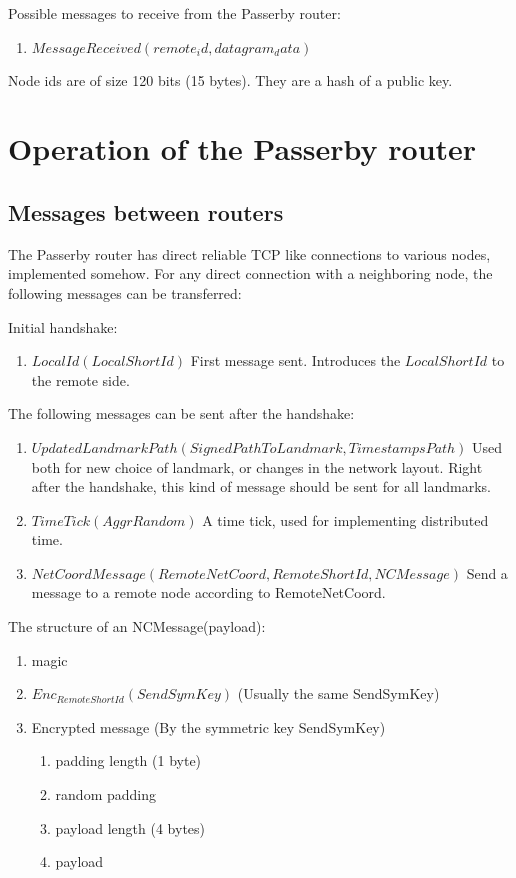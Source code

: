 \documentclass{amsart}
\theoremstyle{definition}
\theoremstyle{remark}
\numberwithin{equation}{section}
\begin{document}
Possible messages to receive from the Passerby router:
\begin{enumerate}
  \item $MessageReceived (remote_id, datagram_data)$
\end{enumerate}

Node ids are of size 120 bits (15 bytes). They are a hash of a public key.

\section{Operation of the Passerby router}

\subsection{Messages between routers}

The Passerby router has direct reliable TCP like connections to various nodes,
implemented somehow. For any direct connection with a neighboring node, the
following messages can be transferred:

Initial handshake:
\begin{enumerate}
  \item $LocalId(LocalShortId)$
      First message sent. Introduces the $LocalShortId$ to the remote side.
\end{enumerate}

The following messages can be sent after the handshake:

\begin{enumerate}
  \item $UpdatedLandmarkPath(SignedPathToLandmark, TimestampsPath)$
      Used both for new choice of landmark, or changes in the network layout.
      Right after the handshake, this kind of message should be sent for all
      landmarks.
  \item $TimeTick(AggrRandom)$
      A time tick, used for implementing distributed time.
  \item $NetCoordMessage(RemoteNetCoord, RemoteShortId, NCMessage)$
    Send a message to a remote node according to RemoteNetCoord.
\end{enumerate}


The structure of an NCMessage(payload):
\begin{enumerate}
  \item magic
  \item $Enc_{RemoteShortId}(SendSymKey)$ (Usually the same SendSymKey)
  \item Encrypted message (By the symmetric key SendSymKey)
    \begin{enumerate}
      \item padding length (1 byte)
      \item random padding
      \item payload length (4 bytes)
      \item payload
    \end{enumerate}
\end{enumerate}
\end{document}

